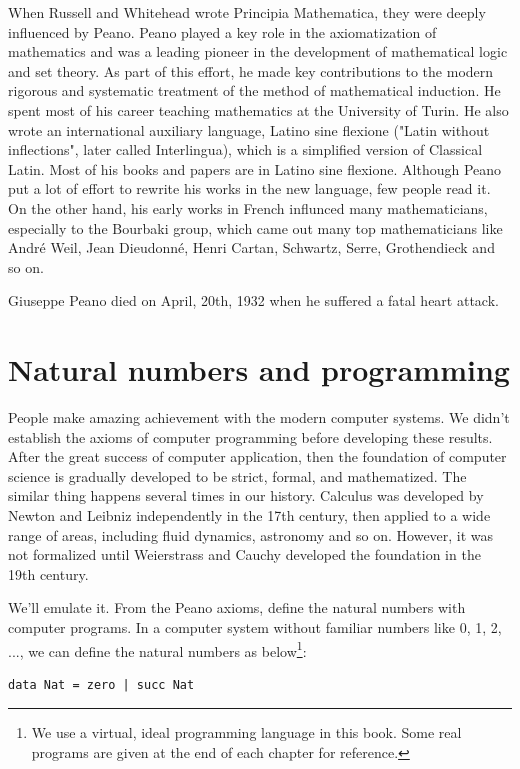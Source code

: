 \documentclass[UTF8]{article}
\begin{document}
When Russell and Whitehead wrote Principia Mathematica, they were deeply influenced by Peano. Peano played a key role in the axiomatization of mathematics and was a leading pioneer in the development of mathematical logic and set theory. As part of this effort, he made key contributions to the modern rigorous and systematic treatment of the method of mathematical induction. He spent most of his career teaching mathematics at the University of Turin. He also wrote an international auxiliary language, Latino sine flexione ("Latin without inflections", later called Interlingua), which is a simplified version of Classical Latin. Most of his books and papers are in Latino sine flexione. Although Peano put a lot of effort to rewrite his works in the new language, few people read it. On the other hand, his early works in French influnced many mathematicians, especially to the Bourbaki group, which came out many top mathematicians like André Weil, Jean Dieudonné, Henri Cartan, Schwartz, Serre, Grothendieck and so on.

Giuseppe Peano died on April, 20th, 1932 when he suffered a fatal heart attack.

\section{Natural numbers and programming}

People make amazing achievement with the modern computer systems. We didn't establish the axioms of computer programming before developing these results. After the great success of computer application, then the foundation of computer science is gradually developed to be strict, formal, and mathematized. The similar thing happens several times in our history. Calculus was developed by Newton and Leibniz independently in the 17th century, then applied to a wide range of areas, including fluid dynamics, astronomy and so on. However, it was not formalized until Weierstrass and Cauchy developed the foundation in the 19th century\cite{M-Kline-2007}.

We'll emulate it. From the Peano axioms, define the natural numbers with computer programs. In a computer system without familiar numbers like 0, 1, 2, ..., we can define the natural numbers as below\footnote{We use a virtual, ideal programming language in this book. Some real programs are given at the end of each chapter for reference.}:

\lstset{language=Haskell}
\begin{lstlisting}
data Nat = zero | succ Nat
\end{lstlisting}
\end{document}
